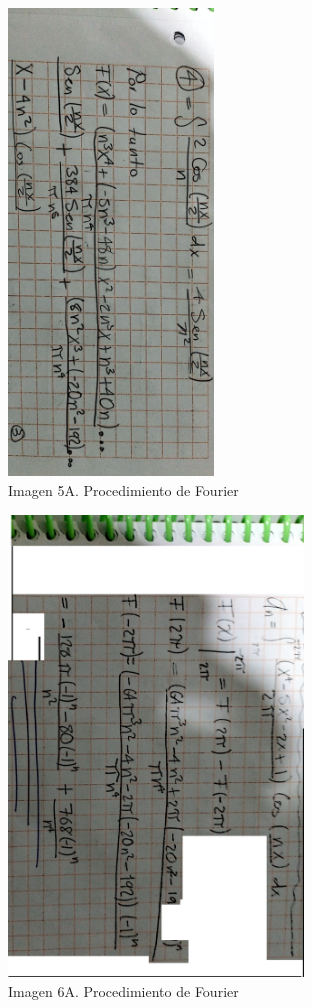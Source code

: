 \begin{figure}[H]
	\centering
	\includegraphics[width=2.15104in,height=4.88023in]{media/image22.png}
	\caption{Imagen 5A. Procedimiento de Fourier}
\end{figure}

\begin{figure}[H]
	\centering
	\includegraphics[width=3.07924in,height=4.81771in]{media/image51.png}
	\caption{Imagen 6A. Procedimiento de Fourier}
\end{figure}

